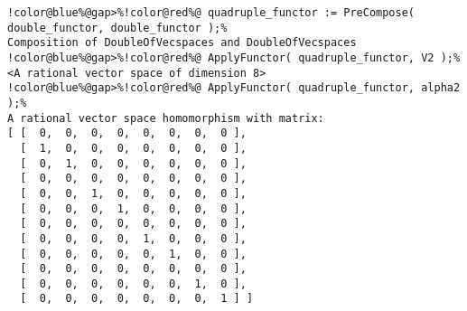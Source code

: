 \begin{Verbatim}[commandchars=!@\%,frame=single]
!color@blue%@gap>%!color@red%@ quadruple_functor := PreCompose( double_functor, double_functor );%
Composition of DoubleOfVecspaces and DoubleOfVecspaces
!color@blue%@gap>%!color@red%@ ApplyFunctor( quadruple_functor, V2 );%
<A rational vector space of dimension 8>
!color@blue%@gap>%!color@red%@ ApplyFunctor( quadruple_functor, alpha2 );%
A rational vector space homomorphism with matrix: 
[ [  0,  0,  0,  0,  0,  0,  0,  0 ],
  [  1,  0,  0,  0,  0,  0,  0,  0 ],
  [  0,  1,  0,  0,  0,  0,  0,  0 ],
  [  0,  0,  0,  0,  0,  0,  0,  0 ],
  [  0,  0,  1,  0,  0,  0,  0,  0 ],
  [  0,  0,  0,  1,  0,  0,  0,  0 ],
  [  0,  0,  0,  0,  0,  0,  0,  0 ],
  [  0,  0,  0,  0,  1,  0,  0,  0 ],
  [  0,  0,  0,  0,  0,  1,  0,  0 ],
  [  0,  0,  0,  0,  0,  0,  0,  0 ],
  [  0,  0,  0,  0,  0,  0,  1,  0 ],
  [  0,  0,  0,  0,  0,  0,  0,  1 ] ]
\end{Verbatim}
